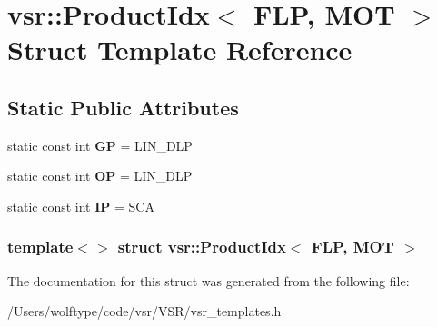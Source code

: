\hypertarget{structvsr_1_1_product_idx_3_01_f_l_p_00_01_m_o_t_01_4}{\section{vsr\-:\-:Product\-Idx$<$ F\-L\-P, M\-O\-T $>$ Struct Template Reference}
\label{structvsr_1_1_product_idx_3_01_f_l_p_00_01_m_o_t_01_4}
}
\subsection*{Static Public Attributes}
\begin{DoxyCompactItemize}
\item 
\hypertarget{structvsr_1_1_product_idx_3_01_f_l_p_00_01_m_o_t_01_4_ab37297872ccf94796259d69e4ed63a43}{static const int {\bfseries G\-P} = L\-I\-N\-\_\-\-D\-L\-P}\label{structvsr_1_1_product_idx_3_01_f_l_p_00_01_m_o_t_01_4_ab37297872ccf94796259d69e4ed63a43}

\item 
\hypertarget{structvsr_1_1_product_idx_3_01_f_l_p_00_01_m_o_t_01_4_aac0bb2dcaffb50626811b5c159831de9}{static const int {\bfseries O\-P} = L\-I\-N\-\_\-\-D\-L\-P}\label{structvsr_1_1_product_idx_3_01_f_l_p_00_01_m_o_t_01_4_aac0bb2dcaffb50626811b5c159831de9}

\item 
\hypertarget{structvsr_1_1_product_idx_3_01_f_l_p_00_01_m_o_t_01_4_a94d4d52367bdbc9bfd132f165775388b}{static const int {\bfseries I\-P} = S\-C\-A}\label{structvsr_1_1_product_idx_3_01_f_l_p_00_01_m_o_t_01_4_a94d4d52367bdbc9bfd132f165775388b}

\end{DoxyCompactItemize}
\subsubsection*{template$<$$>$ struct vsr\-::\-Product\-Idx$<$ F\-L\-P, M\-O\-T $>$}



The documentation for this struct was generated from the following file\-:\begin{DoxyCompactItemize}
\item 
/\-Users/wolftype/code/vsr/\-V\-S\-R/vsr\-\_\-templates.\-h\end{DoxyCompactItemize}
